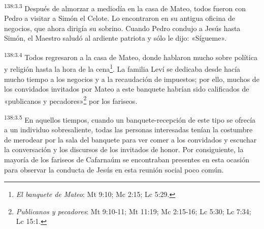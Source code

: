 \par 
\textsuperscript{138:3.3} Después de almorzar a mediodía en la casa de Mateo, todos fueron con Pedro a visitar a Simón el Celote. Lo encontraron en su antigua oficina de negocios, que ahora dirigía su sobrino. Cuando Pedro condujo a Jesús hasta Simón, el Maestro saludó al ardiente patriota y sólo le dijo: «Sígueme».

\par 
\textsuperscript{138:3.4} Todos regresaron a la casa de Mateo, donde hablaron mucho sobre política y religión hasta la hora de la cena\footnote{\textit{El banquete de Mateo}: Mt 9:10; Mc 2:15; Lc 5:29.}. La familia Leví se dedicaba desde hacía mucho tiempo a los negocios y a la recaudación de impuestos; por ello, muchos de los convidados invitados por Mateo a este banquete habrían sido calificados de «publicanos y pecadores»\footnote{\textit{Publicanos y pecadores}: Mt 9:10-11; Mt 11:19; Mc 2:15-16; Lc 5:30; Lc 7:34; Lc 15:1.} por los fariseos.

\par 
\textsuperscript{138:3.5} En aquellos tiempos, cuando un banquete-recepción de este tipo se ofrecía a un individuo sobresaliente, todas las personas interesadas tenían la costumbre de merodear por la sala del banquete para ver comer a los convidados y escuchar la conversación y los discursos de los invitados de honor. Por consiguiente, la mayoría de los fariseos de Cafarnaúm se encontraban presentes en esta ocasión para observar la conducta de Jesús en esta reunión social poco común.

